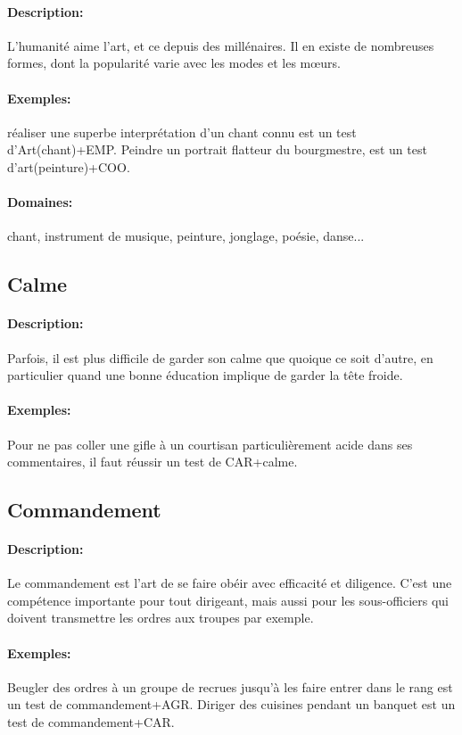 \documentclass[10pt,a4paper,twocolumn]{book}
\begin{document}
\paragraph{Description:}L'humanité aime l'art, et ce depuis des millénaires. Il en existe de nombreuses formes, dont la popularité varie avec les modes et les mœurs. 
\paragraph{Exemples:}réaliser une superbe interprétation d'un chant connu est un test d'Art(chant)+EMP. Peindre un portrait flatteur du bourgmestre, est un test d'art(peinture)+COO.
\paragraph{Domaines:}chant, instrument de musique, peinture, jonglage, poésie, danse...
\subsection{Calme}
\paragraph{Description:}Parfois, il est plus difficile de garder son calme que quoique ce soit d'autre, en particulier quand une bonne éducation implique de garder la tête froide.
\paragraph{Exemples:}Pour ne pas coller une gifle à un courtisan particulièrement acide dans ses commentaires, il faut réussir un test de CAR+calme.
\subsection{Commandement}
\paragraph{Description:}Le commandement est l'art de se faire obéir avec efficacité et diligence. C'est une compétence importante pour tout dirigeant, mais aussi pour les sous-officiers qui doivent transmettre les ordres aux troupes par exemple.
\paragraph{Exemples:}Beugler des ordres à un groupe de recrues jusqu'à les faire entrer dans le rang est un test de commandement+AGR. Diriger des cuisines pendant un banquet est un test de commandement+CAR.
\end{document}
